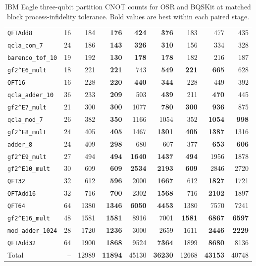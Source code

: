 \begin{table}[p]
\begin{tabular}{lrr|rrr|rrr}
\texttt{QFTAdd8} & 16 & 184 & \textbf{176} & \textbf{424} & \textbf{376} & 183 & 477 & 435 \\
\texttt{qcla\_com\_7} & 24 & 186 & \textbf{143} & \textbf{326} & \textbf{310} & 156 & 334 & 328 \\
\texttt{barenco\_tof\_10} & 19 & 192 & \textbf{130} & \textbf{178} & \textbf{178} & 182 & 216 & 187 \\
\texttt{gf2\textasciicircum{}E6\_mult} & 18 & 221 & \textbf{221} & 743 & \textbf{549} & \textbf{221} & \textbf{665} & 628 \\
\texttt{QFT16} & 16 & 228 & \textbf{220} & \textbf{440} & \textbf{344} & 228 & 449 & 392 \\
\texttt{qcla\_adder\_10} & 36 & 233 & \textbf{209} & 503 & \textbf{439} & 211 & \textbf{470} & 445 \\
\texttt{gf2\textasciicircum{}E7\_mult} & 21 & 300 & \textbf{300} & 1077 & \textbf{780} & \textbf{300} & \textbf{936} & 875 \\
\texttt{qcla\_mod\_7} & 26 & 382 & \textbf{350} & 1166 & 1054 & 352 & \textbf{1054} & \textbf{998} \\
\texttt{gf2\textasciicircum{}E8\_mult} & 24 & 405 & \textbf{405} & 1467 & \textbf{1301} & \textbf{405} & \textbf{1387} & 1316 \\
\texttt{adder\_8} & 24 & 409 & \textbf{298} & 680 & 607 & 377 & \textbf{653} & \textbf{606} \\
\texttt{gf2\textasciicircum{}E9\_mult} & 27 & 494 & \textbf{494} & \textbf{1640} & \textbf{1437} & \textbf{494} & 1956 & 1878 \\
\texttt{gf2\textasciicircum{}E10\_mult} & 30 & 609 & \textbf{609} & \textbf{2534} & \textbf{2193} & \textbf{609} & 2846 & 2720 \\
\texttt{QFT32} & 32 & 612 & \textbf{596} & 2000 & \textbf{1667} & 612 & \textbf{1827} & 1721 \\
\texttt{QFTAdd16} & 32 & 716 & \textbf{700} & 2302 & \textbf{1568} & 716 & \textbf{2102} & 1897 \\
\texttt{QFT64} & 64 & 1380 & \textbf{1346} & \textbf{6050} & \textbf{4453} & 1380 & 7570 & 7241 \\
\texttt{gf2\textasciicircum{}E16\_mult} & 48 & 1581 & \textbf{1581} & 8916 & 7001 & \textbf{1581} & \textbf{6867} & \textbf{6597} \\
\texttt{mod\_adder\_1024} & 28 & 1720 & \textbf{1236} & 3000 & 2659 & 1611 & \textbf{2446} & \textbf{2229} \\
\texttt{QFTAdd32} & 64 & 1900 & \textbf{1868} & 9524 & \textbf{7364} & 1899 & \textbf{8680} & 8136 \\
\hline
Total & -- & 12989 & \textbf{11894} & 45130 & \textbf{36230} & 12668 & \textbf{43153} & 40748 \\
\hline
\end{tabular}
\caption{IBM Eagle three-qubit partition CNOT counts for OSR and BQSKit at matched block process-infidelity tolerance. Bold values are best within each paired stage.}
\label{tab:osr-bqskit-three-qubit-ibm-eagle-counts}
\end{table}

